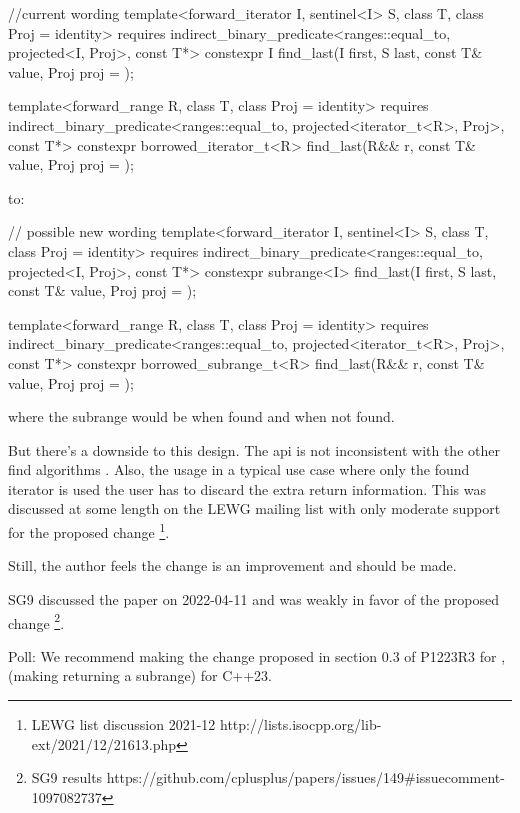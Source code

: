 \documentclass[ebook,10pt,oneside,openany,final]{memoir}
\begin{document}
\begin{itemdecl}
    //current wording
    template<forward_iterator I, sentinel<I> S, class T, class Proj = identity>
      requires indirect_binary_predicate<ranges::equal_to, projected<I, Proj>, const T*>
      constexpr I find_last(I first, S last, const T& value, Proj proj = {});

    template<forward_range R, class T, class Proj = identity>
      requires indirect_binary_predicate<ranges::equal_to, projected<iterator_t<R>, Proj>, const T*>
      constexpr borrowed_iterator_t<R>
        find_last(R&& r, const T& value, Proj proj = {});
\end{itemdecl}

to:

\begin{itemdecl}
    // possible new wording
    template<forward_iterator I, sentinel<I> S, class T, class Proj = identity>
      requires indirect_binary_predicate<ranges::equal_to, projected<I, Proj>, const T*>
      constexpr subrange<I> find_last(I first, S last, const T& value, Proj proj = {});

    template<forward_range R, class T, class Proj = identity>
      requires indirect_binary_predicate<ranges::equal_to, projected<iterator_t<R>, Proj>, const T*>
      constexpr borrowed_subrange_t<R>
        find_last(R&& r, const T& value, Proj proj = {});
\end{itemdecl}

where the subrange would be \tcode{[i, last)} when found and \tcode{[last, last)}
when not found.

But there's a downside to this design.  The api is not inconsistent with the other
find algorithms . Also, the usage in a typical use case
where only the found iterator is used the user has to discard the extra return
information. This was discussed at some length on the LEWG mailing list with only moderate support for the proposed change \footnote{LEWG list discussion 2021-12 http://lists.isocpp.org/lib-ext/2021/12/21613.php}.

Still, the author feels the change is an improvement and should be made.

SG9 discussed the paper on 2022-04-11 and was weakly in favor of the proposed change \footnote{SG9 results https://github.com/cplusplus/papers/issues/149\#issuecomment-1097082737}.

Poll: We recommend making the change proposed in section 0.3 of P1223R3 for , (making  returning a subrange) for C++23.
\end{document}
